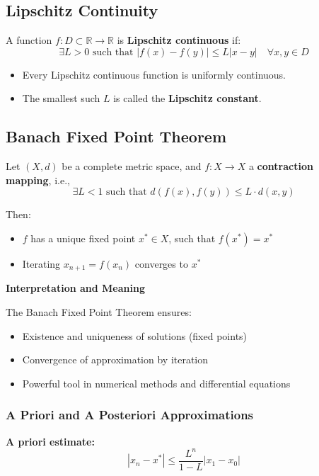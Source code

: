 \subsection{Lipschitz Continuity}

A function \(f: D \subset \mathbb{R} \to \mathbb{R}\) is \textbf{Lipschitz continuous} if:
\[
\exists L > 0 \text{ such that } |f(x) - f(y)| \le L |x - y| \quad \forall x, y \in D
\]

\begin{itemize}[label=\(-\)]
\item Every Lipschitz continuous function is uniformly continuous.
\item The smallest such \(L\) is called the \textbf{Lipschitz constant}.
\end{itemize}

\subsection{Banach Fixed Point Theorem}

Let \((X, d)\) be a complete metric space, and \(f: X \to X\) a \textbf{contraction mapping}, i.e.,
\[
\exists L < 1 \text{ such that } d(f(x), f(y)) \le L \cdot d(x, y)
\]

Then:
\begin{itemize}[label=\(-\)]
\item \(f\) has a unique fixed point \(x^* \in X\), such that \(f(x^*) = x^*\)
\item Iterating \(x_{n+1} = f(x_n)\) converges to \(x^*\)
\end{itemize}

\textbf{Interpretation and Meaning}

The Banach Fixed Point Theorem ensures:
\begin{itemize}[label=\(-\)]
\item Existence and uniqueness of solutions (fixed points)
\item Convergence of approximation by iteration
\item Powerful tool in numerical methods and differential equations
\end{itemize}

\subsubsection{A Priori and A Posteriori Approximations}

\textbf{A priori estimate:}
\[
|x_n - x^*| \le \frac{L^n}{1 - L} |x_1 - x_0|
\]

